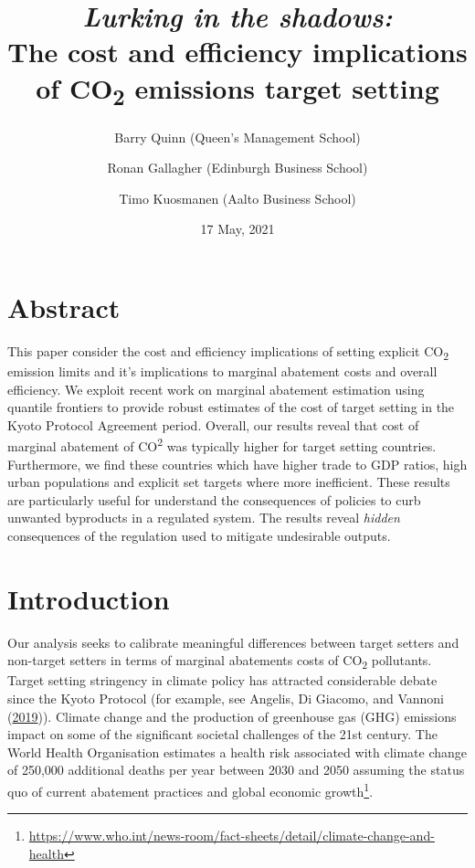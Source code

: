 \documentclass[
  12pt,
]{article}
\title{\emph{Lurking in the shadows:}\\
The cost and efficiency implications of CO\textsubscript{2} emissions target setting}
\author{Barry Quinn (Queen's Management School) \and Ronan Gallagher (Edinburgh Business School) \and Timo Kuosmanen (Aalto Business School)}
\date{17 May, 2021}
\begin{document}
\maketitle

\hypertarget{abstract}{%
\section*{Abstract}\label{abstract}}

This paper consider the cost and efficiency implications of setting explicit CO\textsubscript{2} emission limits and it's implications to marginal abatement costs and overall efficiency. We exploit recent work on marginal abatement estimation using quantile frontiers to provide robust estimates of the cost of target setting in the Kyoto Protocol Agreement period. Overall, our results reveal that cost of marginal abatement of CO\textsuperscript{2} was typically higher for target setting countries. Furthermore, we find these countries which have higher trade to GDP ratios, high urban populations and explicit set targets where more inefficient. These results are particularly useful for understand the consequences of policies to curb unwanted byproducts in a regulated system. The results reveal \emph{hidden} consequences of the regulation used to mitigate undesirable outputs.

\hypertarget{introduction}{%
\section{Introduction}\label{introduction}}

Our analysis seeks to calibrate meaningful differences between target setters and non-target setters in terms of marginal abatements costs of CO\textsubscript{2} pollutants. Target setting stringency in climate policy has attracted considerable debate since the Kyoto Protocol (for example, see Angelis, Di Giacomo, and Vannoni (\protect\hyperlink{ref-De_Angelis2019}{2019})). Climate change and the production of greenhouse gas (GHG) emissions impact on some of the significant societal challenges of the 21st century. The World Health Organisation estimates a health risk associated with climate change of 250,000 additional deaths per year between 2030 and 2050 assuming the status quo of current abatement practices and global economic growth\footnote{\url{https://www.who.int/news-room/fact-sheets/detail/climate-change-and-health}}.
\end{document}
